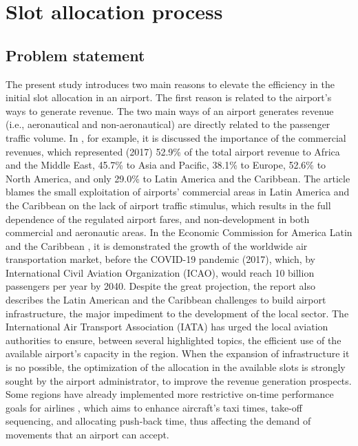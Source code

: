\section{Slot allocation process}%

\subsection{Problem statement}

The present study introduces two main reasons to elevate the efficiency in the initial slot allocation in an airport. The first reason is related to the airport's ways to generate revenue. The two main ways of an airport generates revenue (i.e., aeronautical and non-aeronautical) are directly related to the passenger traffic volume. In \cite{graham2009important}, for example, it is discussed the importance of the commercial revenues, which represented (2017) 52.9\% of the total airport revenue to Africa and the Middle East, 45.7\% to Asia and Pacific, 38.1\% to Europe, 52.6\% to North America, and only 29.0\% to Latin America and the Caribbean. The article blames the small exploitation of airports' commercial areas in Latin America and the Caribbean on the lack of airport traffic stimulus, which results in the full dependence of the regulated airport fares, and non-development in both commercial and aeronautic areas.
In the Economic Commission for America Latin and the Caribbean \cite{planzer2019airport}, it is demonstrated the growth of the worldwide air transportation market, before the COVID-19 pandemic (2017), which, by International Civil Aviation Organization (ICAO), would reach 10 billion passengers per year by 2040. Despite the great projection, the report also describes the Latin American and the Caribbean challenges to build airport infrastructure, the major impediment to the development of the local sector. The International Air Transport Association (IATA) has urged the local aviation authorities to ensure, between several highlighted topics, the efficient use of the available airport’s capacity in the region. When the expansion of infrastructure it is no possible, the optimization of the allocation in the available slots is strongly sought by the airport administrator, to improve the revenue generation prospects. Some regions have already implemented more restrictive on-time performance goals for airlines \cite{ravizza2014aircraft}, which aims to enhance aircraft's taxi times, take-off sequencing, and allocating push-back time, thus affecting the demand of movements that an airport can accept.

